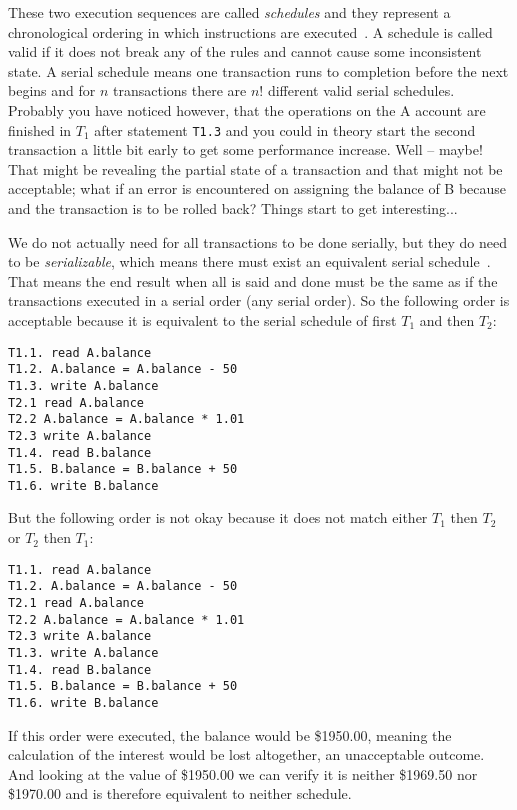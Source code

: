 \documentclass[a4paper]{report}
\begin{document}
These two execution sequences are called \textit{schedules} and they represent a chronological ordering in which instructions are executed~\cite{dsc}. A schedule is called valid if it does not break any of the rules and cannot cause some inconsistent state. A serial schedule means one transaction runs to completion before the next begins and for $n$ transactions there are $n!$ different valid serial schedules. Probably you have noticed however, that the operations on the A account are finished in $T_{1}$ after statement \texttt{T1.3} and you could in theory start the second transaction a little bit early to get some performance increase. Well -- maybe! That might be revealing the partial state of a transaction and that might not be acceptable; what if an error is encountered on assigning the balance of B because and the transaction is to be rolled back? Things start to get interesting...

We do not actually need for all transactions to be done serially, but they do need to be \textit{serializable}, which means there must exist an equivalent serial schedule~\cite{dsc}. That means the end result when all is said and done must be the same as if the transactions executed in a serial order (any serial order). So the following order is acceptable because it is equivalent to the serial schedule of first $T_{1}$ and then $T_{2}$:

\begin{verbatim}
T1.1. read A.balance
T1.2. A.balance = A.balance - 50
T1.3. write A.balance
T2.1 read A.balance
T2.2 A.balance = A.balance * 1.01
T2.3 write A.balance
T1.4. read B.balance
T1.5. B.balance = B.balance + 50
T1.6. write B.balance
\end{verbatim}

But the following order is not okay because it does not match either $T_{1}$ then $T_{2}$ or $T_{2}$ then $T_{1}$:

\begin{verbatim}
T1.1. read A.balance
T1.2. A.balance = A.balance - 50
T2.1 read A.balance
T2.2 A.balance = A.balance * 1.01
T2.3 write A.balance
T1.3. write A.balance
T1.4. read B.balance
T1.5. B.balance = B.balance + 50
T1.6. write B.balance
\end{verbatim}

If this order were executed, the balance would be \$1950.00, meaning the calculation of the interest would be lost altogether, an unacceptable outcome. And looking at the value of \$1950.00 we can verify it is neither \$1969.50 nor \$1970.00 and is therefore equivalent to neither schedule. 
\end{document}
